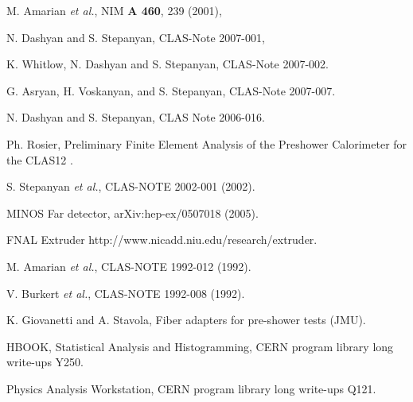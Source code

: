 






\begin{thebibliography}{99}

 M. Amarian {\it et al.}, NIM {\bf A 460}, 239 (2001),

 N. Dashyan and S. Stepanyan, CLAS-Note 2007-001, 

 K. Whitlow, N. Dashyan and S. Stepanyan, 
	CLAS-Note 2007-002. 

 G. Asryan, H. Voskanyan, and S. Stepanyan, 
	CLAS-Note 2007-007. 

 N. Dashyan and S. Stepanyan, CLAS Note 2006-016.

 Ph. Rosier, Preliminary Finite Element Analysis 
of the Preshower Calorimeter for the CLAS12 .

 S. Stepanyan {\it et al.}, CLAS-NOTE 2002-001 (2002).

 MINOS Far detector, arXiv:hep-ex/0507018 (2005).

 FNAL Extruder http://www.nicadd.niu.edu/research/extruder.

 M. Amarian {\it et al.}, CLAS-NOTE 1992-012 (1992).

 V. Burkert {\it et al.}, CLAS-NOTE 1992-008 (1992).

 K. Giovanetti and A. Stavola, Fiber adapters for
pre-shower tests (JMU).

 HBOOK, Statistical Analysis and Histogramming, CERN
program library long write-ups Y250.  

 Physics Analysis Workstation, CERN program library long
write-ups Q121.  

\end{thebibliography}
